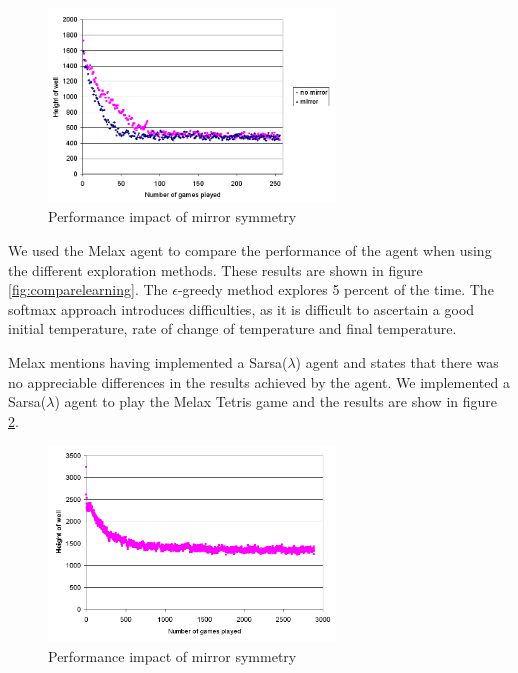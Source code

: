 \documentclass{rucsthesis}
\begin{document}
\begin{figure}[h]
\centering
\includegraphics[width=3in]{mirrormelax.png}
\caption{Performance impact of mirror symmetry}
\label{fig:comparemelax}
\end{figure}

We used the Melax agent to compare the performance of the agent when using the different exploration methods. These results are shown in figure \ref{fig:comparelearning}. The $\epsilon$-greedy method explores 5 percent of the time. The softmax approach introduces difficulties, as it is difficult to ascertain a good initial temperature, rate of change of temperature and final temperature.

Melax mentions having implemented a Sarsa($\lambda$) agent and states that there was no appreciable differences in the results achieved by the agent. We implemented a Sarsa($\lambda$) agent to play the Melax Tetris game and the results are show in figure \ref{fig:melaxsarsa}.

\begin{figure}[h]
\centering
\includegraphics[width=3in]{sarsamelax.png}
\caption{Performance impact of mirror symmetry}
\label{fig:melaxsarsa}
\end{figure} 
\end{document}
